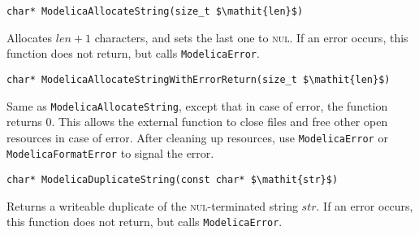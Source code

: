 \begin{functiondefinition}[ModelicaAllocateString]
\begin{synopsis}[C]\begin{lstlisting}
char* ModelicaAllocateString(size_t $\mathit{len}$)
\end{lstlisting}\end{synopsis}
\begin{semantics}
Allocates $\mathit{len}+1$ characters, and sets the last one to \textsc{nul}.
If an error occurs, this function does not return, but calls \lstinline[language=C]!ModelicaError!.
\end{semantics}
\end{functiondefinition}

\begin{functiondefinition}[ModelicaAllocateStringWithErrorReturn]
\begin{synopsis}[C]\begin{lstlisting}
char* ModelicaAllocateStringWithErrorReturn(size_t $\mathit{len}$)
\end{lstlisting}\end{synopsis}
\begin{semantics}
Same as \lstinline[language=C]!ModelicaAllocateString!, except that in case of error, the function returns 0.
This allows the external function to close files and free other open resources in case of error.
After cleaning up resources, use \lstinline[language=C]!ModelicaError! or \lstinline[language=C]!ModelicaFormatError! to signal the error.
\end{semantics}
\end{functiondefinition}

\begin{functiondefinition}[ModelicaDuplicateString]
\begin{synopsis}[C]\begin{lstlisting}
char* ModelicaDuplicateString(const char* $\mathit{str}$)
\end{lstlisting}\end{synopsis}
\begin{semantics}
Returns a writeable duplicate of the \textsc{nul}-terminated string $\mathit{str}$.
If an error occurs, this function does not return, but calls \lstinline[language=C]!ModelicaError!.
\end{semantics}
\end{functiondefinition}


